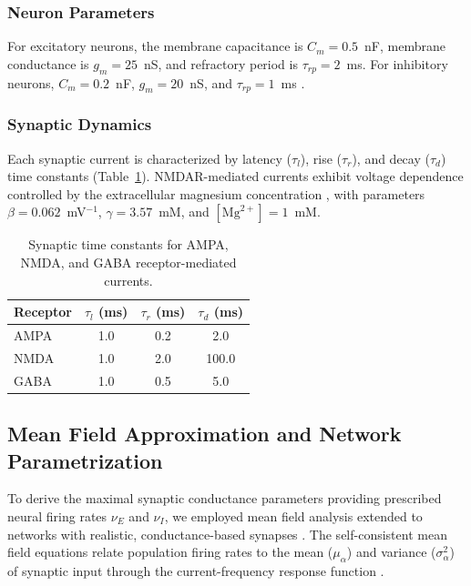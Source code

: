 \documentclass[12pt]{article}
\begin{document}
\subsubsection{Neuron Parameters}

For excitatory neurons, the membrane capacitance is $C_m = 0.5$~nF, membrane conductance is $g_m = 25$~nS, and refractory period is $\tau_{rp} = 2$~ms. For inhibitory neurons, $C_m = 0.2$~nF, $g_m = 20$~nS, and $\tau_{rp} = 1$~ms \citep{Koch2004}.

\subsubsection{Synaptic Dynamics}

Each synaptic current is characterized by latency ($\tau_l$), rise ($\tau_r$), and decay ($\tau_d$) time constants (Table~\ref{tab:synaptic_params}). NMDAR-mediated currents exhibit voltage dependence controlled by the extracellular magnesium concentration \citep{JahrStevens1990}, with parameters $\beta = 0.062$~mV$^{-1}$, $\gamma = 3.57$~mM, and $[\text{Mg}^{2+}] = 1$~mM.

\begin{table}[htbp]
\centering
\caption{Synaptic time constants for AMPA, NMDA, and GABA receptor-mediated currents.}
\label{tab:synaptic_params}
\begin{tabular}{lccc}
\toprule
\textbf{Receptor} & $\tau_l$ (ms) & $\tau_r$ (ms) & $\tau_d$ (ms) \\
\midrule
AMPA  & 1.0 & 0.2 & 2.0 \\
NMDA  & 1.0 & 2.0 & 100.0 \\
GABA  & 1.0 & 0.5 & 5.0 \\
\bottomrule
\end{tabular}
\end{table}

\subsection{Mean Field Approximation and Network Parametrization}

To derive the maximal synaptic conductance parameters providing prescribed neural firing rates $\nu_E$ and $\nu_I$, we employed mean field analysis \citep{AmitBrunel1997, Brunel2000, vanVreeswijk1996} extended to networks with realistic, conductance-based synapses \citep{BrunelWang2001, Renart2003}. The self-consistent mean field equations relate population firing rates to the mean ($\mu_\alpha$) and variance ($\sigma_\alpha^2$) of synaptic input through the current-frequency response function \citep{BrunelSergi1998, FourcaudBrunel2002}.
\end{document}
